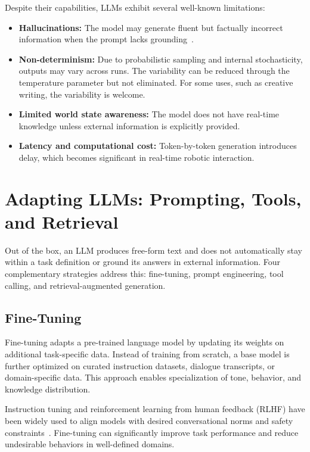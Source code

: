 Despite their capabilities, LLMs exhibit several well-known limitations:

\begin{itemize}
    \item \textbf{Hallucinations:} The model may generate fluent but factually incorrect information when the prompt lacks grounding~\cite{ji2023survey}.
    \item \textbf{Non-determinism:} Due to probabilistic sampling and internal stochasticity, outputs may vary across runs. The variability can be reduced through the temperature parameter but not eliminated. For some uses, such as creative writing, the variability is welcome.
    \item \textbf{Limited world state awareness:} The model does not have real-time knowledge unless external information is explicitly provided.
    \item \textbf{Latency and computational cost:} Token-by-token generation introduces delay, which becomes significant in real-time robotic interaction.
\end{itemize}

\section{Adapting LLMs: Prompting, Tools, and Retrieval}
\label{sec:llm_control}

Out of the box, an LLM produces free-form text and does not automatically stay within a task definition or ground its answers in external information.
Four complementary strategies address this: fine-tuning, prompt engineering, tool calling, and retrieval-augmented generation.

\subsection{Fine-Tuning}

Fine-tuning adapts a pre-trained language model by updating its weights on additional task-specific data.
Instead of training from scratch, a base model is further optimized on curated instruction datasets, dialogue transcripts, or domain-specific data.
This approach enables specialization of tone, behavior, and knowledge distribution.

Instruction tuning and reinforcement learning from human feedback (RLHF) have been widely used to align models with desired conversational norms and safety constraints~\cite{ouyang2022training, chung2022scaling}.
Fine-tuning can significantly improve task performance and reduce undesirable behaviors in well-defined domains.

